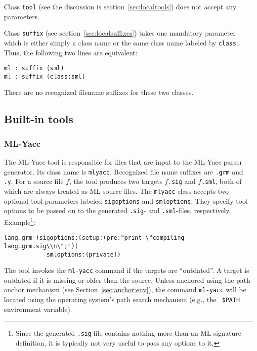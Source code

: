 Class {\tt tool} (see the discussion is section~\ref{sec:localtools})
does not accept any parameters.

Class {\tt suffix} (see section~\ref{sec:localsuffixes}) takes one
mandatory parameter which is either simply a class name or the same
class name labeled by {\tt class}.  Thus, the following two lines are
equivalent:

\begin{lstlisting}[language=CM]
ml : suffix (sml)
ml : suffix (class:sml)
\end{lstlisting}%

There are no recognized filename suffixes for these two classes.

\subsection{Built-in tools}
\label{sec:builtin-tools}

\subsubsection{ML-Yacc}

The ML-Yacc tool is responsible for files that are input to the
ML-Yacc parser generator.  Its class name is {\tt mlyacc}.  Recognized
file name suffixes are {\tt .grm} and {\tt .y}.  For a source file
$f$, the tool produces two targets $f${\tt .sig} and $f${\tt .sml},
both of which are always treated as ML source files.  The {\tt mlyacc}
class accepts two optional tool parameters labeled {\tt sigoptions}
and {\tt smloptions}.  They specify tool options to be passed on to
the generated {\tt .sig}- and {\tt .sml}-files, respectively.
Example\footnote{Since the generated {\tt .sig}-file contains nothing
more than an ML signature definition, it is typically not very useful
to pass any options to it.}:

\begin{lstlisting}[language=CM]
  lang.grm (sigoptions:(setup:(pre:"print \"compiling lang.grm.sig\\n\";"))
            smloptions:(private))
\end{lstlisting}%

The tool invokes the {\tt ml-yacc} command if the targets are
``outdated''.  A target is outdated if it is missing or older than the
source.  Unless anchored using the path anchor mechanism (see
Section~\ref{sec:anchor:env}), the command {\tt ml-yacc} will be located
using the operating system's path search mechanism (e.g., the {\tt
\$PATH} environment variable).

